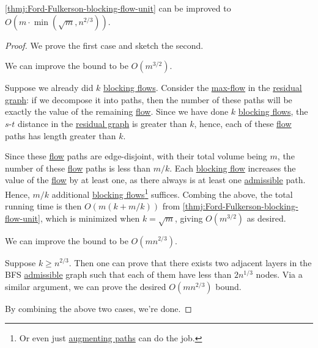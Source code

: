 \begin{corollary}\label{col:Ford-Fulkerson-blocking-flow-unit}
	\autoref{thmj:Ford-Fulkerson-blocking-flow-unit} can be improved to \(O(m \cdot \min (\sqrt{m} , n^{2 / 3}))\).
\end{corollary}
\begin{proof}
	We prove the first case and sketch the second.

	\begin{claim}
		We can improve the bound to be \(O(m^{3 / 2})\).
	\end{claim}
	\begin{explanation}
		Suppose we already did \(k\) \hyperref[def:blocking-flow]{blocking flows}. Consider the \hyperref[prb:s-t-max-flow]{max-flow} in the \hyperref[def:residual-graph]{residual graph}: if we decompose it into paths, then the number of these paths will be exactly the value of the remaining \hyperref[def:flow]{flow}. Since we have done \(k\) \hyperref[def:blocking-flow]{blocking flows}, the \(s\)-\(t\) distance in the \hyperref[def:residual-graph]{residual graph} is greater than \(k\), hence, each of these \hyperref[def:flow]{flow} paths has length greater than \(k\).

		Since these \hyperref[def:flow]{flow} paths are edge-disjoint, with their total volume being \(m\), the number of these \hyperref[def:flow]{flow} paths is less than \(m / k\). Each \hyperref[def:blocking-flow]{blocking flow} increases the value of the \hyperref[def:flow]{flow} by at least one, as there always is at least one \hyperref[def:admissible]{admissible} path. Hence, \(m / k\) additional \hyperref[def:blocking-flow]{blocking flows}\footnote{Or even just \hyperref[def:augmenting-path]{augmenting paths} can do the job.} suffices. Combing the above, the total running time is then \(O(m (k + m / k))\) from \autoref{thmj:Ford-Fulkerson-blocking-flow-unit}, which is minimized when \(k = \sqrt{m} \), giving \(O(m^{3 / 2})\) as desired.
	\end{explanation}

	\begin{claim}
		We can improve the bound to be \(O(mn^{2 / 3})\).
	\end{claim}
	\begin{explanation}
		Suppose \(k \geq n^{2 / 3}\). Then one can prove that there exists two adjacent layers in the BFS \hyperref[def:admissible]{admissible} graph such that each of them have less than \(2 n^{1 / 3}\) nodes. Via a similar argument, we can prove the desired \(O(mn^{2 / 3})\) bound.
	\end{explanation}

	By combining the above two cases, we're done.
\end{proof}

